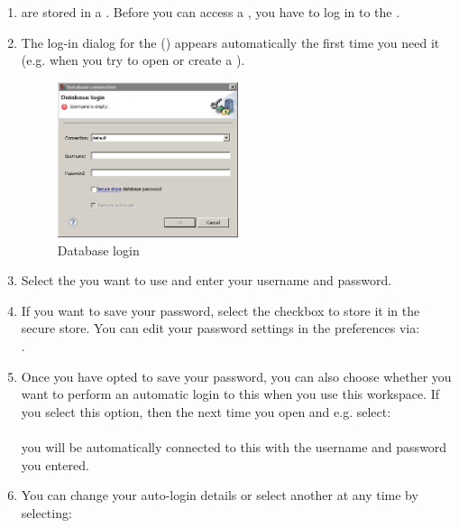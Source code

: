 \begin{enumerate}
\item \gdprojects{} are stored in  a \gddb{}. Before you can access a \gdproject{}, you have to log in to the \gddb{}. 
\item The log-in dialog for the \gddb{} () appears automatically the first time you need it (e.g. when you try to open or create a \gdproject{}). 

\begin{figure}[h]
\begin{center}
\includegraphics[width=0.5\textwidth]{Tasks/Database/PS/dblogin}
\caption{Database login}
\label{dblogin}
\end{center}
\end{figure}



\item Select the \gddb{} you want to use and enter your username and password.


\item If you want to save your \gddb{} password, select the checkbox to store it in the secure store. You can edit your password settings in the preferences via: \\
. 
\item Once you have opted to save your password, you can also choose whether you want to perform an automatic login to this \gddb{} when you use this workspace. If you select this option, then the next time you open \app{} and e.g. select:\\
\\
you will be automatically connected to this \gddb{} with the username and password you entered.
\item You can change your auto-login details or select another \gddb{} at any time by selecting:\\
\end{enumerate}

